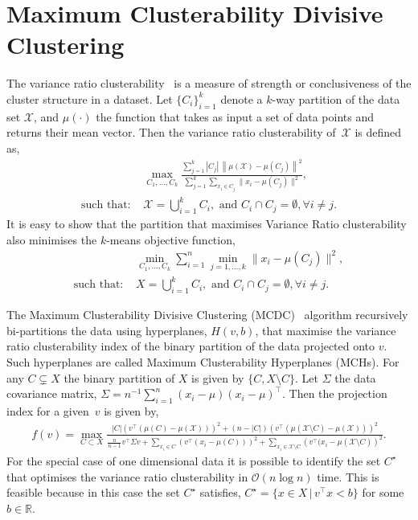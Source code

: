 \documentclass{book}
\def\R{\mathbb{R}}
\begin{document}
\section{Maximum Clusterability Divisive Clustering}

The variance ratio clusterability~\cite{Zhang2001} is a measure of strength or conclusiveness
of the cluster structure in a dataset. 
%
Let $\{C_i\}_{i=1}^k$ denote a $k$-way partition of the data set $\mathcal{X}$, and $\mu(\cdot)$ the function
that takes
as input a set of data points and returns their mean vector.
Then the variance ratio clusterability of~$\mathcal{X}$ is defined as,
%
\begin{align*}
%
& \max_{C_1,\ldots,C_k}\frac{\sum_{j=1}^k |C_j| \,  \left\| \mu(\mathcal{X}) - \mu(C_j) \right\|^2}
	{\sum_{j=1}^k   \sum_{x_i \in C_j}\|x_i - \mu(C_j)\|^2},\\
%
\text{such that: } & \mathcal{X} = \bigcup_{i=1}^k  C_i, \text{ and }  C_i \cap C_j = \emptyset, \forall i \neq j.
%
\end{align*}
%
It is easy to show that the partition that maximises Variance Ratio clusterability
also minimises the $k$-means objective function,
%
\begin{align*}
%
& \min_{C_1, \ldots, C_k} \sum_{i=1}^n \min_{j = 1, \dots, k}\|x_i - \mu(C_j)\|^2,\\
%
\text{such that: } & X = \bigcup_{i=1}^k  C_i, \text{ and }  C_i \cap C_j = \emptyset, \forall i \neq j.
%
\end{align*}
%

The Maximum Clusterability Divisive Clustering (MCDC)~\cite{HofmeyrP2015}
algorithm recursively bi-partitions the data using hyperplanes, $H(v,b)$, that maximise
the variance ratio clusterability index of the binary partition of the data projected onto $v$. 
%
Such hyperplanes are called Maximum Clusterability Hyperplanes (MCHs). 
%
For any $C \subsetneq X$ the binary partition of $X$ is given by $\{C, X \setminus C\}$.
Let $\Sigma$ the data covariance matrix, $\Sigma = n^{-1} \sum_{i=1}^n (x_i - \mu)(x_i-\mu)^\top$.
%
Then the projection index for a given~$v$ is given by,
%
\begin{align*}
%
f(v) = \max_{C \subset X} \frac{\vert C | \left(v^\top( \mu({C}) - \mu(\mathcal{X}))\right)^2 + (n-|C|)\left(v^\top( \mu(\mathcal{X}\setminus C) - \mu(\mathcal{X}))\right)^2}
%
{\frac{n}{n-1}v^\top \Sigma v +   \sum_{x_i \in C}\left(v^\top(x_i - \mu(C))\right)^2 +  \sum_{x_i \in \mathcal{X}\setminus C}\left(v^\top(x_i - \mu(\mathcal{X} \setminus C)\right)^2}.
%
\end{align*}
%
For the special case of one dimensional data it is possible to identify the set $C^\star$
that optimises the variance ratio clusterability in 
$\mathcal{O}(n \log n)$ time. This is feasible because in this case the set $C^\star$ 
satisfies, $C^\star = \{ x \in X \,|\, v^\top x < b \}$ for some
$b \in \R$.
\end{document}
